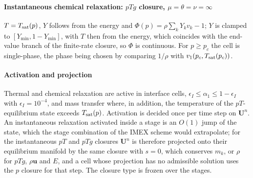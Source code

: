 \paragraph{Instantaneous chemical relaxation: $pTg$ closure, $\mu=\theta=\nu=\infty$}
$T=T_{\rm sat}(p)$, $Y$ follows from the energy and $\Phi(p)=\rho\sum_kY_kv_k-1$; $Y$ is clamped to $[Y_{\min},1-Y_{\min}]$, with $T$
then from the energy, which coincides with the end-value branch of the finite-rate closure, so $\Phi$ is continuous. For
$p\ge p_c$ the cell is single-phase, the phase being chosen by comparing $1/\rho$ with $v_1(p_c,T_{\rm sat}(p_c))$.

\paragraph{Activation and projection}
Thermal and chemical relaxation are active in interface cells,
$\epsilon_I\le\alpha_1\le1-\epsilon_I$ with $\epsilon_I=10^{-4}$, and mass transfer where, in addition, the temperature of the $pT$-equilibrium
state exceeds $T_{\rm sat}(p)$. Activation is decided once per
time step on $\mathbf U^n$. An instantaneous relaxation activated inside a stage is an $O(1)$ jump of the state, which the stage
combination of the IMEX scheme would extrapolate; for the instantaneous $pT$ and $pTg$ closures $\mathbf U^n$ is therefore projected
onto their equilibrium manifold by the same closure with $s=0$, which conserves $m_k$, or $\rho$ for $pTg$, $\rho\mathbf u$ and $E$, and a cell whose
projection has no admissible solution uses the $p$ closure for that step. The closure type is frozen over the
stages.

